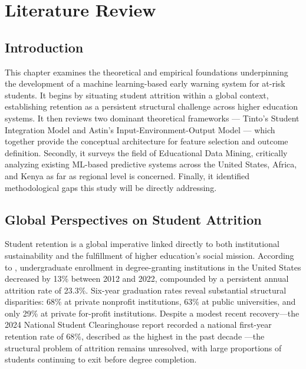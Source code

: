 \documentclass[12pt]{report}
\begin{document}
\chapter{Literature Review}

\section{Introduction}
This chapter examines the theoretical and empirical foundations underpinning
the development of a machine learning-based early warning system for at-risk students.
It begins by situating student attrition within a global context, establishing retention
as a persistent structural challenge across higher education systems. It then reviews
two dominant theoretical frameworks --- Tinto's Student Integration Model and Astin's
Input-Environment-Output Model --- which together provide the conceptual architecture
for feature selection and outcome definition. Secondly, it surveys the field of Educational
Data Mining, critically analyzing existing ML-based predictive systems across the United
States, Africa, and Kenya as far as regional level is concerned. Finally, it identified
methodological gaps this study will be directly addressing.

\section{Global Perspectives on Student Attrition}

Student retention is a global imperative linked directly to both institutional
sustainability and the fulfillment of higher education's social mission.
According to \textcite{NCES2024}, undergraduate enrollment in degree-granting
institutions in the United States decreased by 13\% between 2012 and 2022,
compounded by a persistent annual attrition rate of 23.3\%. Six-year graduation
rates reveal substantial structural disparities: 68\% at private nonprofit
institutions, 63\% at public universities, and only 29\% at private for-profit
institutions. Despite a modest recent recovery---the 2024 National Student
Clearinghouse report recorded a national first-year retention rate of 68\%,
described as the highest in the past decade \parencite{NSC2024}---the
structural problem of attrition remains unresolved, with large proportions of
students continuing to exit before degree completion.
\end{document}
